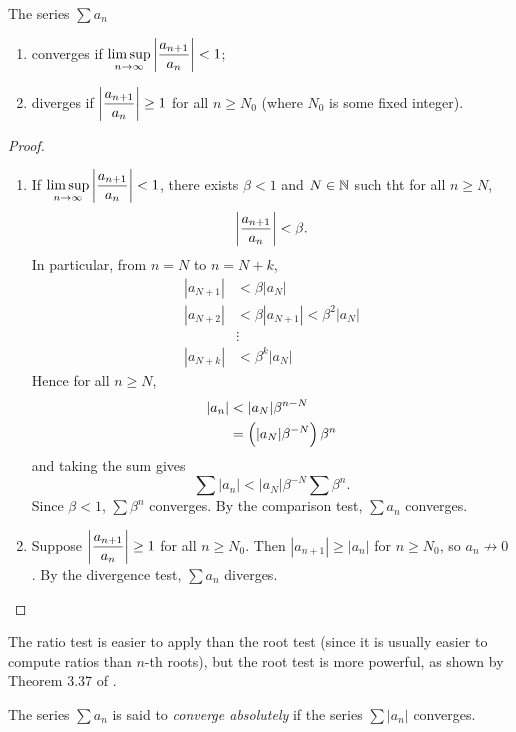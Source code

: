 \begin{lemma}\label{lemma:ratio-test}
The series $\sum a_n$
\begin{enumerate}[label=(\roman*)]
\item converges if $\displaystyle\limsup_{n\to\infty}\left|\frac{a_{n+1}}{a_n}\right|<1$;
\item diverges if $\displaystyle\left|\frac{a_{n+1}}{a_n}\right|\ge1$ for all $n\ge N_0$ (where $N_0$ is some fixed integer).
\end{enumerate}
\end{lemma}

\begin{proof} \
\begin{enumerate}[label=(\roman*)]
\item If $\displaystyle\limsup_{n\to\infty}\left|\frac{a_{n+1}}{a_n}\right|<1$, there exists $\beta<1$ and $N\in\mathbb N$ such tht for all $n\ge N$,
\[\left|\frac{a_{n+1}}{a_n}\right|<\beta.\]
In particular, from $n=N$ to $n=N+k$,
\begin{align*}
|a_{N+1}|&<\beta|a_N|\\
|a_{N+2}|&<\beta|a_{N+1}|<\beta^2|a_N|\\
&\vdots\\
|a_{N+k}|&<\beta^k|a_N|
\end{align*}
Hence for all $n\ge N$,
\begin{align*}
|a_n|&<|a_N|\beta^{n-N}\\
&=\brac{|a_N|\beta^{-N}}\beta^n
\end{align*}
and taking the sum gives
\[\sum|a_n|<|a_N|\beta^{-N}\sum\beta^n.\]
Since $\beta<1$, $\sum\beta^n$ converges. By the comparison test, $\sum a_n$ converges.

\item Suppose $\displaystyle\left|\frac{a_{n+1}}{a_n}\right|\ge1$ for all $n\ge N_0$. Then $|a_{n+1}|\ge|a_n|$ for $n\ge N_0$, so $a_n\not\to0$. By the divergence test, $\sum a_n$ diverges.
\end{enumerate}
\end{proof}

\begin{remark}
The ratio test is easier to apply than the root test (since it is usually easier to compute ratios than $n$-th roots), but the root test is more powerful, as shown by Theorem 3.37 of \cite{rudin}.
\end{remark}

The series $\sum a_n$ is said to \emph{converge absolutely} if the series $\sum|a_n|$ converges.

